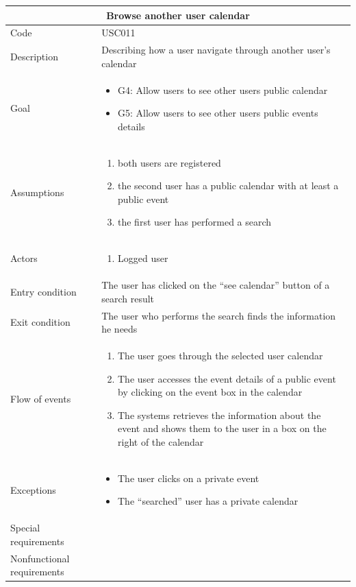 \documentclass[10pt,a4paper,titlepage]{article}
\begin{document}
\begin{tabular}[h]{| p{3cm} | p{10cm} |} 
\hline \multicolumn{2}{|c|}{\textbf{Browse another user calendar}} \\  
\hline Code & USC011\\  
\hline Description & Describing how a user navigate through another user's calendar\\ 
\hline Goal & \begin{itemize}
\item G4: Allow users to see other users public calendar
\item G5: Allow users to see other users public events details
\end{itemize}\\ 
\hline Assumptions  & \begin{enumerate} 
\item both users are registered
\item the second user has a public calendar with at least a public event
\item the first user has performed a search 
\end{enumerate} \\ 
\hline Actors &  \begin{enumerate} 
\item Logged user
\end{enumerate} \\ 
\hline Entry condition & The user has clicked on the “see calendar” button of a search result\\ 
\hline Exit condition & The user who performs the search finds the information he needs\\ 
\hline Flow of events & \begin{enumerate} 
\item The user goes through the selected user calendar
\item The user accesses the event details of a public event by clicking on the event box in the calendar
\item The systems retrieves the information about the event and shows them to the user in a box on the right of the calendar
\end{enumerate}\\ 
\hline Exceptions & \begin{itemize}
\item The user clicks on a private event
\item The “searched” user has a private calendar
\end{itemize}\\ 
\hline Special requirements & \\ 
\hline Nonfunctional requirements & \\
\hline 
\end{tabular} 
\end{document}
